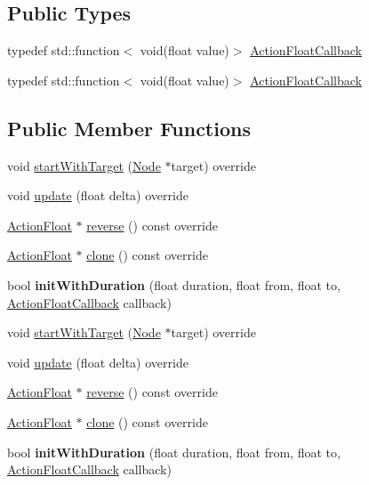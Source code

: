 \subsection*{Public Types}
\begin{DoxyCompactItemize}
\item 
typedef std\+::function$<$ void(float value)$>$ \hyperlink{classActionFloat_a47a1fbc750167a8f9d754c62a62eaafa}{Action\+Float\+Callback}
\item 
typedef std\+::function$<$ void(float value)$>$ \hyperlink{classActionFloat_a47a1fbc750167a8f9d754c62a62eaafa}{Action\+Float\+Callback}
\end{DoxyCompactItemize}
\subsection*{Public Member Functions}
\begin{DoxyCompactItemize}
\item 
void \hyperlink{classActionFloat_a898675a5b5c372d44abec94d55632ae0}{start\+With\+Target} (\hyperlink{classNode}{Node} $\ast$target) override
\item 
void \hyperlink{classActionFloat_a0b6b333b5524a617f3088b2c1893b55c}{update} (float delta) override
\item 
\hyperlink{classActionFloat}{Action\+Float} $\ast$ \hyperlink{classActionFloat_ace1ae89fd53f2e0e195edcae89601032}{reverse} () const override
\item 
\hyperlink{classActionFloat}{Action\+Float} $\ast$ \hyperlink{classActionFloat_aedf782fede49194ec2a70dfa06a18599}{clone} () const override
\item 
\mbox{\label{classActionFloat_a395728bb0c8e68d896d36c8f713bb20f}} 
bool {\bfseries init\+With\+Duration} (float duration, float from, float to, \hyperlink{classActionFloat_a47a1fbc750167a8f9d754c62a62eaafa}{Action\+Float\+Callback} callback)
\item 
void \hyperlink{classActionFloat_a898675a5b5c372d44abec94d55632ae0}{start\+With\+Target} (\hyperlink{classNode}{Node} $\ast$target) override
\item 
void \hyperlink{classActionFloat_a0b6b333b5524a617f3088b2c1893b55c}{update} (float delta) override
\item 
\hyperlink{classActionFloat}{Action\+Float} $\ast$ \hyperlink{classActionFloat_a72d356e0e5a2c891f238993e56d36d25}{reverse} () const override
\item 
\hyperlink{classActionFloat}{Action\+Float} $\ast$ \hyperlink{classActionFloat_ac661a208d2c168b873ca8c5234433f90}{clone} () const override
\item 
\mbox{\label{classActionFloat_a395728bb0c8e68d896d36c8f713bb20f}} 
bool {\bfseries init\+With\+Duration} (float duration, float from, float to, \hyperlink{classActionFloat_a47a1fbc750167a8f9d754c62a62eaafa}{Action\+Float\+Callback} callback)
\end{DoxyCompactItemize}
